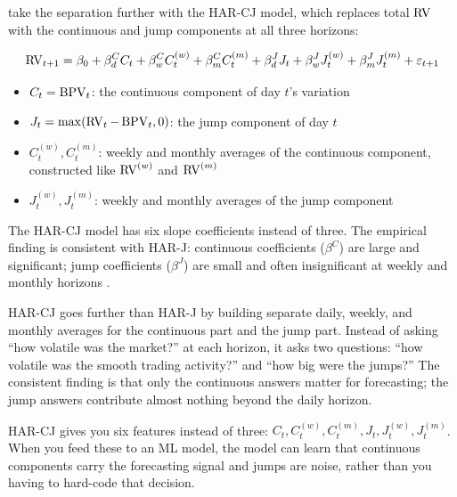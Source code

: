 \citet{CorsiPirinoReno2010} take the separation further with the HAR-CJ model, which replaces total $\operatorname{RV}$ with the continuous and jump components at all three horizons:

\begin{equation}
  \operatorname{RV}_{t+1} = \beta_0 + \beta^C_d C_t + \beta^C_w C^{(w)}_t + \beta^C_m C^{(m)}_t
             + \beta^J_d J_t + \beta^J_w J^{(w)}_t + \beta^J_m J^{(m)}_t + \varepsilon_{t+1}
  \label{eq:har-cj}
\end{equation}
\begin{itemize}[nosep]
  \item $C_t = \operatorname{BPV}_t$: the continuous component of day $t$'s variation
  \item $J_t = \max(\operatorname{RV}_t - \operatorname{BPV}_t, 0)$: the jump component of day $t$
  \item $C^{(w)}_t, C^{(m)}_t$: weekly and monthly averages of the continuous component, constructed like $\operatorname{RV}^{(w)}$ and $\operatorname{RV}^{(m)}$
  \item $J^{(w)}_t, J^{(m)}_t$: weekly and monthly averages of the jump component
\end{itemize}

The HAR-CJ model has six slope coefficients instead of three.
The empirical finding is consistent with HAR-J: continuous coefficients ($\beta^C$) are large and significant; jump coefficients ($\beta^J$) are small and often insignificant at weekly and monthly horizons \citep{CorsiPirinoReno2010}.

\begin{intuition}
HAR-CJ goes further than HAR-J by building separate daily, weekly, and monthly averages for the continuous part and the jump part.
Instead of asking ``how volatile was the market?'' at each horizon, it asks two questions: ``how volatile was the smooth trading activity?'' and ``how big were the jumps?''
The consistent finding is that only the continuous answers matter for forecasting; the jump answers contribute almost nothing beyond the daily horizon.
\end{intuition}

\begin{projectconnection}
HAR-CJ gives you six features instead of three: $C_t, C^{(w)}_t, C^{(m)}_t, J_t, J^{(w)}_t, J^{(m)}_t$.
When you feed these to an ML model, the model can learn that continuous components carry the forecasting signal and jumps are noise, rather than you having to hard-code that decision.
\end{projectconnection}

